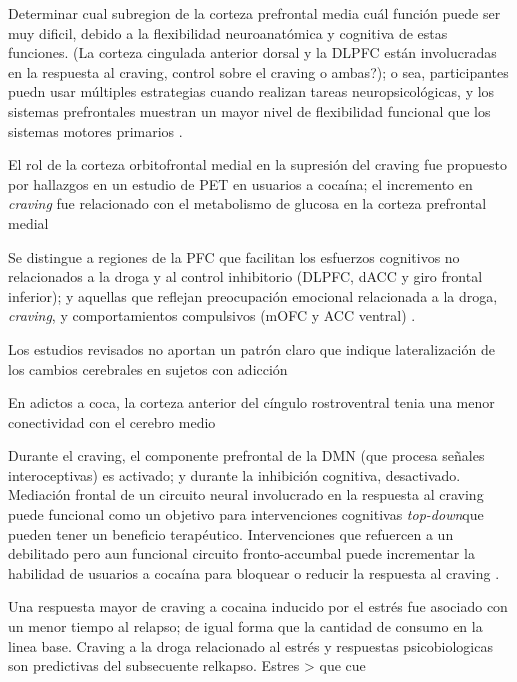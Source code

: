 Determinar cual subregion de la corteza prefrontal media cuál función puede ser muy dificil, debido a la flexibilidad neuroanatómica y cognitiva de estas funciones. (La corteza cingulada anterior dorsal y la DLPFC están involucradas en la respuesta al craving, control sobre el craving o ambas?); o sea, participantes puedn usar múltiples estrategias cuando realizan tareas neuropsicológicas, y los sistemas prefrontales muestran un mayor nivel de flexibilidad funcional que los sistemas motores primarios \parencite{Goldstein2012a}.

El rol de la corteza orbitofrontal medial en la supresión del craving fue propuesto por hallazgos en un estudio de PET en usuarios a cocaína; el incremento en \textit{craving} fue relacionado con el metabolismo de glucosa en la corteza prefrontal medial \parencite{Goldstein2012a}

Se distingue a regiones de la PFC que facilitan los esfuerzos cognitivos no relacionados a la droga y al control inhibitorio (DLPFC, dACC y giro frontal inferior); y aquellas que reflejan preocupación emocional relacionada a la droga, \textit{craving}, y comportamientos compulsivos (mOFC y ACC ventral) \parencite{Goldstein2012a}.

Los estudios revisados no aportan un patrón claro que indique lateralización de los cambios cerebrales en sujetos con adicción \parencite{Goldstein2012a}

En adictos a coca, la corteza anterior del cíngulo rostroventral tenia una menor conectividad con el cerebro medio \parencite{Gu2010}

Durante el craving, el componente prefrontal de la DMN (que procesa señales interoceptivas) es activado; y durante la inhibición cognitiva, desactivado.
Mediación frontal de un circuito neural involucrado en la respuesta al craving puede funcional como un objetivo para intervenciones cognitivas \textit{top-down}que pueden tener un beneficio terapéutico. Intervenciones que refuercen a un debilitado pero aun funcional circuito fronto-accumbal puede incrementar la habilidad de usuarios a cocaína para bloquear o reducir la respuesta al craving \parencite{Volkow2010a}.

Una respuesta mayor de craving a cocaina inducido por el estrés fue asociado con un menor tiempo al relapso; de igual forma que la cantidad de consumo en la linea base.
Craving a la droga relacionado al estrés y respuestas psicobiologicas son predictivas del subsecuente relkapso. Estres > que cue \parencite{Sinha2005}

